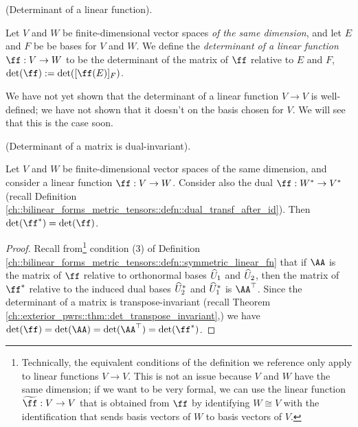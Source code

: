 

\begin{defn}
    (Determinant of a linear function).
    
    Let $V$ and $W$ be finite-dimensional vector spaces \textit{of the same dimension}, and let $E$ and $F$ be be bases for $V$ and $W$. We define the \textit{determinant of a linear function $\ff:V \rightarrow W$} to be the determinant of the matrix of $\ff$ relative to $E$ and $F$, $\det(\ff) := \det([\ff(E)]_F)$.
\end{defn}

\begin{remark}
    We have not yet shown that the determinant of a linear function $V \rightarrow V$ is well-defined; we have not shown that it doesn't on the basis chosen for $V$. We will see that this is the case soon.
\end{remark}

\begin{theorem}
    (Determinant of a matrix is dual-invariant).
    
    Let $V$ and $W$ be finite-dimensional vector spaces of the same dimension, and consider a linear function $\ff:V \rightarrow W$. Consider also the dual $\ff:W^* \rightarrow V^*$ (recall Definition \ref{ch::bilinear_forms_metric_tensors::defn::dual_transf_after_id}). Then $\det(\ff^*) = \det(\ff)$.
\end{theorem}

\begin{proof}
    Recall from\footnote{Technically, the equivalent conditions of the definition we reference only apply to linear functions $V \rightarrow V$. This is not an issue because $V$ and $W$ have the same dimension; if we want to be very formal, we can use the linear function $\widetilde{\ff}:V \rightarrow V$ that is obtained from $\ff$ by identifying $W \cong V$ with the identification that sends basis vectors of $W$ to basis vectors of $V$.} condition (3) of Definition \ref{ch::bilinear_forms_metric_tensors::defn::symmetric_linear_fn} that if $\AA$ is the matrix of $\ff$ relative to orthonormal bases $\widehat{U}_1$ and $\widehat{U}_2$, then the matrix of $\ff^*$ relative to the induced dual bases $\widehat{U}_2^*$ and $\widehat{U}_1^*$ is $\AA^\top$. Since the determinant of a matrix is transpose-invariant (recall Theorem \ref{ch::exterior_pwrs::thm::det_transpose_invariant},) we have $\det(\ff) = \det(\AA) = \det(\AA^\top) = \det(\ff^*)$.
\end{proof}

